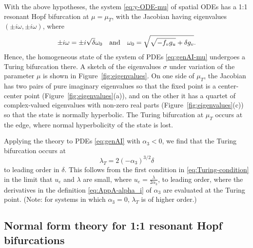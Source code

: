 \documentclass[11pt]{article}
\numberwithin{equation}{section}
\begin{document}
With the above hypotheses, the system \eqref{eq:y-ODE-mu} of spatial ODEs has a 1:1 resonant Hopf bifurcation at $\mu = \mu_T$, with the Jacobian having eigenvalues $(\pm i \omega, \pm i \omega)$, where 
\begin{equation}\label{eq:omega-NF}
    \pm i \omega = \pm i \sqrt{\delta} \omega_0 \quad {\rm and} \quad \omega_0 = \sqrt{\sqrt{-f_vg_u} + \delta g_v}.
\end{equation}
Hence, the homogeneous state of the system of PDEs \eqref{eq:genAI-mu} undergoes a Turing bifurcation there.
A sketch of the eigenvalues $\sigma$ under variation of the parameter $\mu$ is shown in Figure~\ref{fig:eigenvalues}.
On one side of $\mu_T$, the Jacobian has two pairs of pure imaginary eigenvalues so that the fixed point is a center-center point (Figure~\ref{fig:eigenvalues}(a)), and on the other it has a quartet of complex-valued eigenvalues with non-zero real parts (Figure~\ref{fig:eigenvalues}(c)) so that the state is normally hyperbolic.
The Turing bifurcation at $\mu_T$ occurs at the edge, where normal hyperbolicity of the state is lost.

Applying the theory to PDEs \eqref{eq:genAI} with $\alpha_3 < 0$, we find that the Turing bifurcation occurs at 
\begin{equation}\label{eq:lambdaT}
\lambda_T = 2 (-\alpha_3)^{3/2} \delta
\end{equation}
to leading order in $\delta$.
This follows from the first condition in \eqref{eq:Turing-condition} in the limit that $u_e$ and $\lambda$ are small, where $u_e=\frac{\lambda}{2\alpha_3}$, to leading order, where the derivatives in the definition 
\eqref{eq:AppA-alpha_i} of $\alpha_3$ are evaluated at the Turing point.
(Note: for systems in which $\alpha_3=0$, $\lambda_T$ is of higher order.)


\subsection{Normal form theory for 1:1 resonant Hopf bifurcations}\label{sec:oneoneNF}
\end{document}
